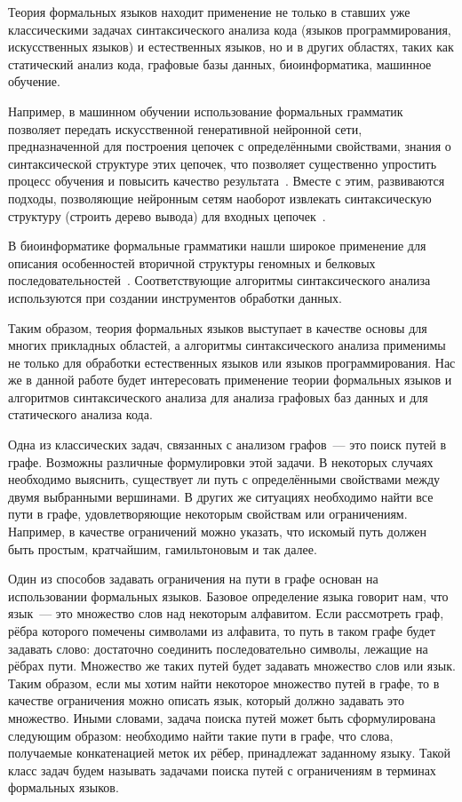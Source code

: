 
Теория формальных языков находит применение не только в ставших уже классическими задачах синтаксического анализа кода (языков программирования, искусственных языков) и естественных языков, но и в других областях, таких как статический анализ кода, графовые базы данных, биоинформатика, машинное обучение.

Например, в машинном обучении использование формальных грамматик позволяет передать искусственной генеративной нейронной сети, предназначенной для построения цепочек с определёнными свойствами, знания о синтаксической структуре этих цепочек, что позволяет существенно упростить процесс обучения и повысить качество результата~.
Вместе с этим, развиваются подходы, позволяющие нейронным сетям наоборот извлекать синтаксическую структуру (строить дерево вывода) для входных цепочек~.

В биоинформатике формальные грамматики нашли широкое применение для описания особенностей вторичной структуры геномных и белковых последовательностей~.
Соответствующие алгоритмы синтаксического анализа используются при создании инструментов обработки данных.

Таким образом, теория формальных языков выступает в качестве основы для многих прикладных областей, а алгоритмы синтаксического анализа применимы не только для обработки естественных языков или языков программирования.
Нас же в данной работе будет интересовать применение теории формальных языков и алгоритмов синтаксического анализа для анализа графовых баз данных и для статического анализа кода.

Одна из классических задач, связанных с анализом графов~--- это поиск путей в графе.
Возможны различные формулировки этой задачи.
В некоторых случаях необходимо выяснить, существует ли путь с определёнными свойствами между двумя выбранными вершинами.
В других же ситуациях необходимо найти все пути в графе, удовлетворяющие некоторым свойствам или ограничениям.
Например, в качестве ограничений можно указать, что искомый путь должен быть простым, кратчайшим, гамильтоновым и так далее.

Один из способов задавать ограничения на пути в графе основан на использовании формальных языков.
Базовое определение языка говорит нам, что язык~--- это множество слов над некоторым алфавитом.
Если рассмотреть граф, рёбра которого помечены символами из алфавита, то путь в таком графе будет задавать слово: достаточно соединить последовательно символы, лежащие на рёбрах пути.
Множество же таких путей будет задавать множество слов или язык.
Таким образом, если мы хотим найти некоторое множество путей в графе, то в качестве ограничения можно описать язык, который должно задавать это множество.
Иными словами, задача поиска путей может быть сформулирована следующим образом: необходимо найти такие пути в графе, что слова, получаемые конкатенацией меток их рёбер, принадлежат заданному языку.
Такой класс задач будем называть задачами поиска путей с ограничениям в терминах формальных языков.

